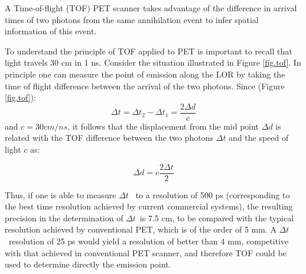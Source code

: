 A Time-of-flight (TOF) PET scanner takes advantage of the difference in arrival times of two photons from the same annihilation event to infer spatial information of this event. 

To understand the principle of TOF applied to PET is important to recall that light travels 30 cm in 1 ns. Consider the situation illustrated in Figure \ref{fig.tof}. In principle one can measure the point of emission along the LOR by taking the time of flight difference between the arrival of the two photons. Since (Figure \ref{fig.tof}):
\begin{equation}
\Delta t = \Delta t_2 - \Delta t_1 = \frac{2 \Delta d}{c}
\end{equation}
%
and $c = 30 cm/ns$, it follows that the displacement from the mid point
$\Delta d$ is related with the TOF difference between the two photons $\Delta t$ and the speed of light $c$ as:

\begin{equation}
\Delta d =c \frac{2 \Delta t}{2}
\end{equation}

Thus, if one is able to measure $\Delta t$~ to a resolution of 500 ps (corresponding to the
best time resolution achieved by current commercial systems), the resulting precision in the
determination of $\Delta t$~is 7.5 cm, to be compared with the typical resolution achieved by
conventional PET, which is of the order of 5 mm. A $\Delta t$~resolution of 25 ps would yield a resolution of better than 4 mm, competitive with that achieved in conventional PET scanner, and therefore TOF could be used to determine directly the emission point. 

